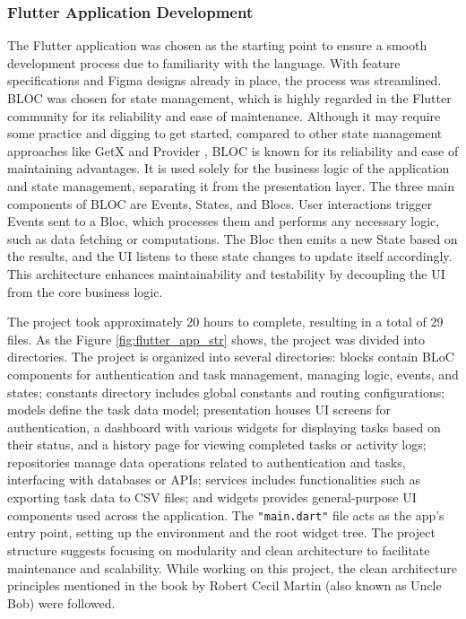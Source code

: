\subsubsection{Flutter Application Development}
The Flutter application was chosen as the starting point to ensure a smooth development process due to familiarity with the language. With feature specifications and Figma designs already in place, the process was streamlined. BLOC \cite{bloc} was chosen for state management, which is highly regarded in the Flutter community for its reliability and ease of maintenance. Although it may require some practice and digging to get started, compared to other state management approaches like GetX \cite{getX} and Provider \cite{provider}, BLOC is known for its reliability and ease of maintaining advantages. It is used solely for the business logic of the application and state management, separating it from the presentation layer. The three main components of BLOC are Events, States, and Blocs. User interactions trigger Events sent to a Bloc, which processes them and performs any necessary logic, such as data fetching or computations. The Bloc then emits a new State based on the results, and the UI listens to these state changes to update itself accordingly. This architecture enhances maintainability and testability by decoupling the UI from the core business logic.

\par
The project took approximately 20 hours to complete, resulting in a total of 29 files. As the Figure \ref*{fig:flutter_app_str} shows, the project was divided into directories. The project is organized into several directories: blocks contain BLoC components for authentication and task management, managing logic, events, and states; constants directory includes global constants and routing configurations; models define the task data model; presentation houses UI screens for authentication, a dashboard with various widgets for displaying tasks based on their status, and a history page for viewing completed tasks or activity logs; repositories manage data operations related to authentication and tasks, interfacing with databases or APIs; services includes functionalities such as exporting task data to CSV files; and widgets provides general-purpose UI components used across the application. The \verb|"main.dart"| file acts as the app's entry point, setting up the environment and the root widget tree. The project structure suggests focusing on modularity and clean architecture to facilitate maintenance and scalability. While working on this project, the clean architecture principles mentioned in the book \cite{martin2009clean} by Robert Cecil Martin (also known as Uncle Bob) were followed.
